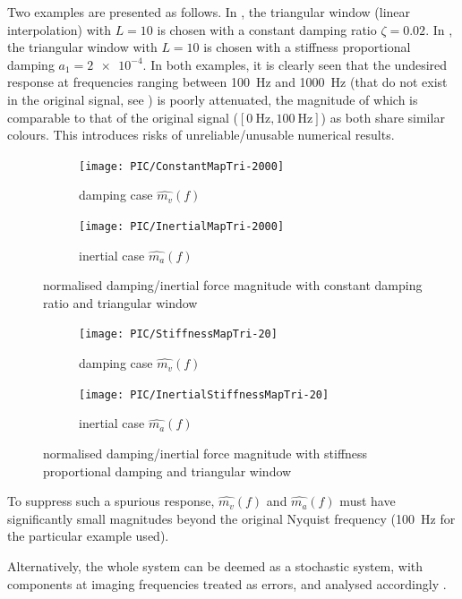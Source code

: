 Two examples are presented as follows.
In , the triangular window (linear interpolation) with $L=10$ is chosen with a constant damping ratio $\zeta=\num{0.02}$. In , the triangular window with $L=10$ is chosen with a stiffness proportional damping $a_1=\num{2e-4}$. In both examples, it is clearly seen that the undesired response at frequencies ranging between \SI{100}{\hertz} and \SI{1000}{\hertz} (that do not exist in the original signal, see ) is poorly attenuated, the magnitude of which is comparable to that of the original signal ($[\SI{0}{\hertz},\SI{100}{\hertz}]$) as both share similar colours. This introduces risks of unreliable/unusable numerical results.
\begin{figure}[htb!]
\centering
\begin{subfigure}{.48\textwidth}
\texttt{[image: PIC/ConstantMapTri-2000]}
\caption{damping case $\hat{m_v}\left(f\right)$}
\end{subfigure}
\begin{subfigure}{.48\textwidth}
\texttt{[image: PIC/InertialMapTri-2000]}
\caption{inertial case $\hat{m_a}\left(f\right)$}
\end{subfigure}
\caption{normalised damping/inertial force magnitude with constant damping ratio and triangular window}\label{fig:map_constant}
\end{figure}
\begin{figure}[htb!]
\centering
\begin{subfigure}{.48\textwidth}
\texttt{[image: PIC/StiffnessMapTri-20]}
\caption{damping case $\hat{m_v}\left(f\right)$}
\end{subfigure}
\begin{subfigure}{.48\textwidth}
\texttt{[image: PIC/InertialStiffnessMapTri-20]}
\caption{inertial case $\hat{m_a}\left(f\right)$}
\end{subfigure}
\caption{normalised damping/inertial force magnitude with stiffness proportional damping and triangular window}\label{fig:map_stiffness}
\end{figure}

To suppress such a spurious response, $\hat{m_v}\left(f\right)$ and $\hat{m_a}\left(f\right)$ must have significantly small magnitudes beyond the original Nyquist frequency (\SI{100}{\hertz} for the particular example used).

Alternatively, the whole system can be deemed as a stochastic system, with components at imaging frequencies treated as errors, and analysed accordingly \citep[see, e.g.,][]{Soederstroem2002}.
